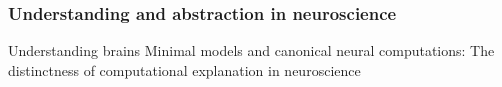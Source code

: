 \documentclass{article}
\theoremstyle{definition} \newtheorem{definition}{Definition}  \newtheorem{example}{Example}
\theoremstyle{remark} \newtheorem{remark}{Remark}
\newcounter{ct}
\begin{document}
\subsubsection{Understanding and abstraction in neuroscience}
\citep{marr1976computation, marr2010vision}
\citep{chirimuuta2018mmm} %
\citep{kriegeskorte2019peeling}
\citep{stinson2020idealized}
\citep{levenstein2023theory}
\citep{chirimuuta2024brain} 
Understanding brains \citep{marder2015understanding} \citep{lindsay2023testing} \citep{barman2024towards} \citep{dowling2018understanding} \citep{gao2015simplicity}
Minimal models and canonical neural computations: The distinctness of computational explanation in neuroscience \citep{chirimuuta2014minimal} 








\end{document}
